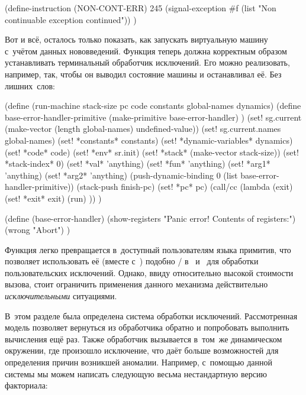 \begin{code:lisp}
(define-instruction (NON-CONT-ERR) 245
  (signal-exception #f (list "Non continuable exception continued")) )
\end{code:lisp}

Вот и всё, осталось только показать, как запускать виртуальную машину с~учётом
данных нововведений. Функция  теперь должна корректным образом
устанавливать терминальный обработчик исключений. Его можно реализовать,
например, так, чтобы он выводил состояние машины и останавливал её. Без
лишних~слов:

\begin{code:lisp}
(define (run-machine stack-size pc code constants global-names dynamics)
  (define base-error-handler-primitive
    (make-primitive base-error-handler) )
  (set! sg.current (make-vector (length global-names) undefined-value))
  (set! sg.current.names global-names)
  (set! *constants*         constants)
  (set! *dynamic-variables* dynamics)
  (set! *code*              code)
  (set! *env*               sr.init)
  (set! *stack*             (make-vector stack-size))
  (set! *stack-index*       0)
  (set! *val*               'anything)
  (set! *fun*               'anything)
  (set! *arg1*              'anything)
  (set! *arg2*              'anything)
  (push-dynamic-binding 0 (list base-error-handler-primitive))
  (stack-push finish-pc)
  (set! *pc* pc)
  (call/cc (lambda (exit)
             (set! *exit* exit)
             (run) )) )

(define (base-error-handler)
  (show-registers "Panic error! Contents of registers:")
  (wrong "Abort") )
\end{code:lisp}

Функция  легко превращается в~доступный пользователям языка
примитив, что позволяет использовать её (вместе с~) подобно
\slash{} в~{\CommonLisp} и~{\EuLisp} для обработки
пользовательских исключений. Однако, ввиду относительно высокой стоимости
вызова, стоит ограничить применения данного механизма действительно
\emph{исключительными} ситуациями.

\bigskip

В~этом разделе была определена система обработки исключений. Рассмотренная
модель позволяет вернуться из обработчика обратно и попробовать выполнить
вычисления ещё раз. Также обработчик вызывается в~том~же динамическом окружении,
где произошло исключение, что даёт больше возможностей для определения причин
возникшей аномалии. Например, с~помощью данной системы мы можем написать
следующую весьма нестандартную версию факториала:

